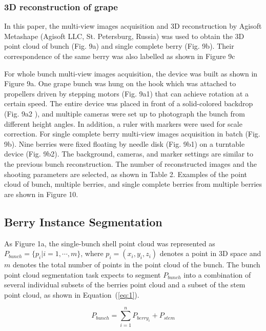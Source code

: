 \documentclass[12pt]{article}
\begin{document}
\subsubsection{3D reconstruction of grape}

In this paper, the multi-view images acquisition and 3D reconstruction by Agisoft Metashape (Agisoft LLC, St. Petersburg, Russia) was used to obtain the 3D point cloud of bunch (Fig. 9a) and single complete berry (Fig. 9b). 
Their correspondence of the same berry was also labelled as shown in Figure 9c


For whole bunch multi-view images acquisition, the device was built as shown in Figure 9a. 
One grape bunch was hung on the hook which was attached to propellers driven by stepping motors (Fig. 9a1) that can achieve rotation at a certain speed. 
The entire device was placed in front of a solid-colored backdrop (Fig. 9a2 ), and multiple cameras were set up to photograph the bunch from different height angles. 
In addition, a ruler with markers were used for scale correction. 
For single complete berry multi-view images acquisition in batch (Fig. 9b). 
Nine berries were fixed floating by needle disk (Fig. 9b1) on a turntable device (Fig. 9b2). 
The background, cameras, and marker settings are similar to the previous bunch reconstruction. 
The number of reconstructed images and the shooting parameters are selected, as shown in Table 2. 
Examples of the point cloud of bunch, multiple berries, and single complete berries from multiple berries are shown in Figure 10.



\subsection{Berry Instance Segmentation}

As Figure 1a, the single-bunch shell point cloud was represented as $P_{bunch}=\{p_i | i=1, \cdots, m\}$, where $p_i=(x_i,y_i,z_i)$ denotes a point in 3D space and $m$ denotes the total number of points in the point cloud of the bunch. The bunch point cloud segmentation task expects to segment $P_{bunch}$ into a combination of several individual subsets of the berries point cloud and a subset of the stem point cloud, as shown in Equation~(\ref{eq:1}).

\begin{equation}
P_{bunch} = \sum_{i=1}^{n} P_{berry_{i}} + P_{stem}
\label{eq:1}
\end{equation}
\end{document}
